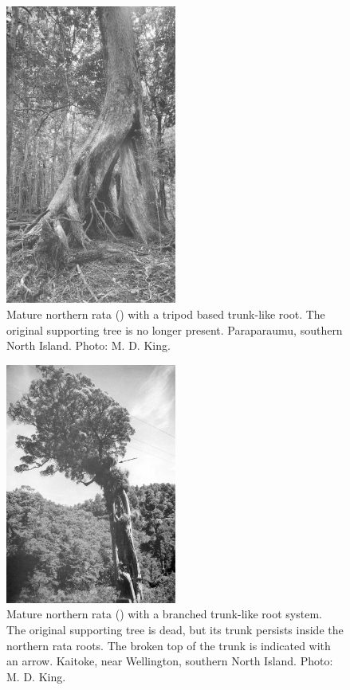 \begin{figure}
	\includegraphics[width=0.5\textwidth]{graphics/figure51rata.jpg}
	\centering
	\caption[Mature northern rata with a tripod based trunk-like root]{Mature northern rata () with a tripod based trunk-like root.
	The original supporting tree is no longer present.
	Paraparaumu, southern North Island.
	Photo: M. D. King.}%
	\label{fig:51rata}
\end{figure}

\begin{figure}
	\includegraphics[width=0.5\textwidth]{graphics/figure52rata-branched.jpg}
	\centering
	\caption[Mature northern rata with a branched trunk-like root system]{Mature northern rata () with a branched trunk-like root system.
The original supporting tree is dead, but its trunk persists inside the northern rata roots.
The broken top of the trunk is indicated with an arrow.
Kaitoke, near Wellington, southern North Island.
	Photo: M. D. King.}%
	\label{fig:52rata-branched}
\end{figure}

